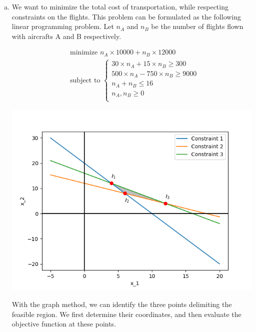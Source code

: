 \documentclass[a4paper, 10pt, twoside]{article}
\begin{document}
\begin{enumerate}[a)]
    \item We want to minimize the total cost of transportation, while respecting constraints on the flights. This problem can be formulated as the following linear programming problem.
          Let $n_{A}$ and $n_{B}$ be the number of flights flown with aircrafts A and B respectively.

          \begin{align*}
               & \text{minimize } n_{A} \times 10000 + n_{B} \times 12000 \\
               & \text{subject to }
              \begin{cases}
                  30 \times n_{A} + 15 \times n_{B} \ge 300    \\
                  500 \times n_{A} - 750 \times n_{B} \ge 9000 \\
                  n_{A} + n_{B} \le 16                         \\
                  n_{A}, n_{B} \ge 0                           \\
              \end{cases}
          \end{align*}

          \begin{center}
            \includegraphics[width = .5\textwidth]{graph2.png}
          \end{center}

          With the graph method, we can identify the three points delimiting the feasible region. We first determine their coordinates, and then evaluate the objective function at these points.


\end{enumerate}
\end{document}
